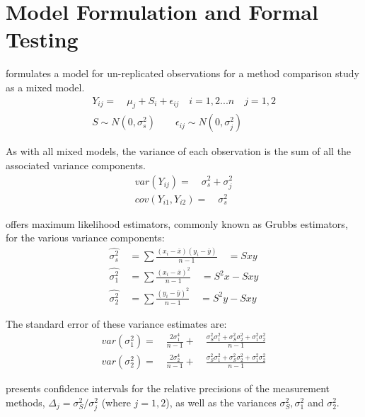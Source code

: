 \documentclass[12pt, a4paper]{report}
\theoremstyle{plain}
\theoremstyle{definition}
\theoremstyle{remark}
\begin{document}
\section{Model Formulation and Formal Testing}

\citet{Kinsella} formulates a model for un-replicated observations
for a method comparison study as a mixed model.
\begin{eqnarray}
Y_{ij} =\quad \mu_{j} + S_{i} + \epsilon_{ij} \quad i=1,2...n\quad
j=1,2\\
S \sim N(0,\sigma^{2}_{s})\qquad \epsilon_{ij} \sim
N(0,\sigma^{2}_{j}) \nonumber
\end{eqnarray}

As with all mixed models, the variance of each observation is the
sum of all the associated variance components.
\begin{eqnarray}
var(Y_{ij}) =\quad \sigma^{2}_{s} + \sigma^{2}_{j} \\
cov(Y_{i1},Y_{i2})=\quad \sigma^{2}_{s} \nonumber
\end{eqnarray}

\citet{Grubbs48} offers maximum likelihood estimators, commonly
known as Grubbs estimators, for the various variance components:
\begin{eqnarray}
\hat{\sigma^{2}_{s}} \quad= \sum{\frac{(x_{i}-\bar{x})(y_{i}-\bar{y})}{n-1}}\quad=Sxy\\
\hat{\sigma^{2}_{1}} \quad= \sum{\frac{(x_{i}-\bar{x})^{2}}{n-1}} \quad=S^{2}x-Sxy \nonumber\\
\hat{\sigma^{2}_{2}} \quad=
\sum{\frac{(y_{i}-\bar{y})^{2}}{n-1}}\quad=S^{2}y-Sxy \nonumber
\nonumber
\end{eqnarray}

The standard error of these variance estimates are:
\begin{eqnarray}
var(\sigma^{2}_{1}) =\quad \frac{2\sigma^{4}_{1}}{n-1} +\quad
\frac{\sigma^2_{S}\sigma^2_{1}+\sigma^2_{S}\sigma^2_{2}+\sigma^2_{1}\sigma^2_{2}
}{n-1}\\
var(\sigma^{2}_{2}) =\quad \frac{2\sigma^{4}_{2}}{n-1} +\quad
\frac{\sigma^2_{S}\sigma^2_{1}+\sigma^2_{S}\sigma^2_{2}+\sigma^2_{1}\sigma^2_{2}
}{n-1}\nonumber
\end{eqnarray}

\citet{Thompson}presents confidence intervals for the relative
precisions of the measurement methods, $\Delta_{j}=
\sigma^2_{S}/\sigma^2_{j}$ (where $j=1,2$), as well as the
variances $\sigma^{2}_{S}, \sigma^{2}_{1}$ and $\sigma^{2}_{2}$.
\end{document}
